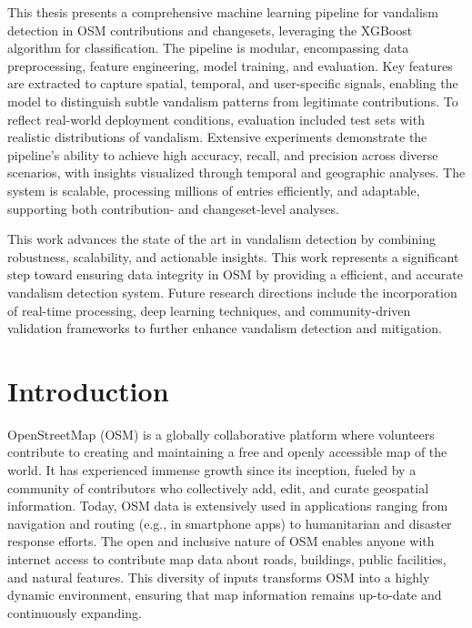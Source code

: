 \documentclass[
    13pt, %
    a4paper, %
    DIV14, %
    listof=totoc, %
    bibliography=totoc, %
    index=totoc, %
    headsepline
]{scrreprt}
\begin{document}
This thesis presents a comprehensive machine learning pipeline for vandalism detection in OSM contributions and changesets, leveraging the XGBoost algorithm for classification. The pipeline is modular, encompassing data preprocessing, feature engineering, model training, and evaluation. Key features are extracted to capture spatial, temporal, and user-specific signals, enabling the model to distinguish subtle vandalism patterns from legitimate contributions. To reflect real-world deployment conditions, evaluation included test sets with realistic distributions of vandalism. Extensive experiments demonstrate the pipeline’s ability to achieve high accuracy, recall, and precision across diverse scenarios, with insights visualized through temporal and geographic analyses. The system is scalable, processing millions of entries efficiently, and adaptable, supporting both contribution- and changeset-level analyses.

This work advances the state of the art in vandalism detection by combining robustness, scalability, and actionable insights. This work represents a significant step toward ensuring data integrity in OSM by providing a efficient, and accurate vandalism detection system. Future research directions include the incorporation of real-time processing, deep learning techniques, and community-driven validation frameworks to further enhance vandalism detection and mitigation.

\newpage
\tableofcontents
\newpage

\setcounter{page}{1}


\chapter{Introduction}\label{intro}

OpenStreetMap (OSM) \cite{osm_home} is a globally collaborative platform where volunteers contribute to creating and maintaining a free and openly accessible map of the world. It has experienced immense growth since its inception, fueled by a community of contributors who collectively add, edit, and curate geospatial information. Today, OSM data is extensively used in applications ranging from navigation and routing (e.g., in smartphone apps) to humanitarian and disaster response efforts. The open and inclusive nature of OSM enables anyone with internet access to contribute map data about roads, buildings, public facilities, and natural features. This diversity of inputs transforms OSM into a highly dynamic environment, ensuring that map information remains up-to-date and continuously expanding.
\end{document}
